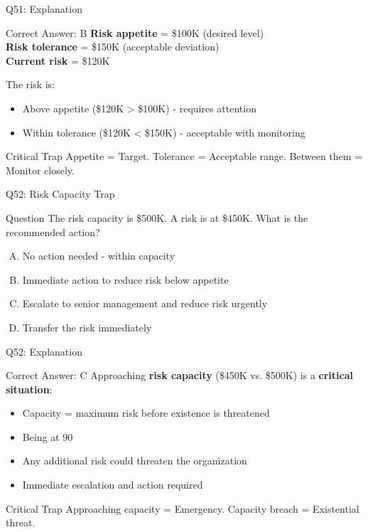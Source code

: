 \documentclass{beamer}
\begin{document}
	\begin{frame}{Q51: Explanation}
		\begin{block}{Correct Answer: B}
			\textbf{Risk appetite} = \$100K (desired level)\\
			\textbf{Risk tolerance} = \$150K (acceptable deviation)\\
			\textbf{Current risk} = \$120K
			
			The risk is:
			\begin{itemize}
				\item Above appetite (\$120K > \$100K) - requires attention
				\item Within tolerance (\$120K < \$150K) - acceptable with monitoring
			\end{itemize}
		\end{block}
		\begin{alertblock}{Critical Trap}
			Appetite = Target.
			Tolerance = Acceptable range.
			Between them = Monitor closely.
		\end{alertblock}
	\end{frame}
	
	\begin{frame}{Q52: Risk Capacity Trap}
		\begin{block}{Question}
			The risk capacity is \$500K. A risk is at \$450K. What is the recommended action?
		\end{block}
		\begin{enumerate}[(A)]
			\item No action needed - within capacity
			\item Immediate action to reduce risk below appetite
			\item Escalate to senior management and reduce risk urgently
			\item Transfer the risk immediately
		\end{enumerate}
	\end{frame}
	
	\begin{frame}{Q52: Explanation}
		\begin{block}{Correct Answer: C}
			Approaching \textbf{risk capacity} (\$450K vs. \$500K) is a \textbf{critical situation}:
			\begin{itemize}
				\item Capacity = maximum risk before existence is threatened
				\item Being at 90%
				\item Any additional risk could threaten the organization
				\item Immediate escalation and action required
			\end{itemize}
		\end{block}
		\begin{alertblock}{Critical Trap}
			Approaching capacity = Emergency.
			Capacity breach = Existential threat.
		\end{alertblock}
	\end{frame}
	
\end{document}
